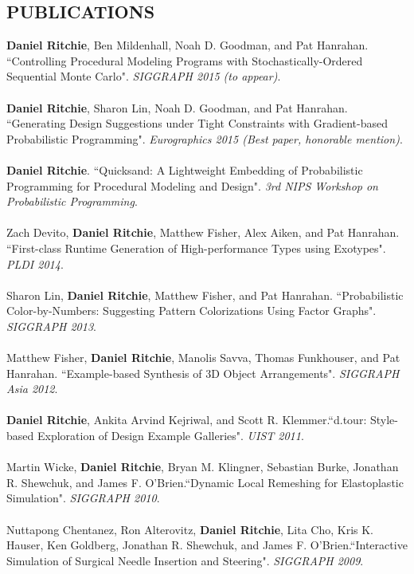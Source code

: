 \documentclass[line,margin]{res}
\begin{document}
\begin{resume}
\section{PUBLICATIONS}
{\bf Daniel Ritchie}, Ben Mildenhall, Noah D. Goodman, and Pat Hanrahan. ``Controlling Procedural Modeling Programs with Stochastically-Ordered Sequential Monte Carlo". {\sl SIGGRAPH 2015 (to appear)}.
\\ \\
{\bf Daniel Ritchie}, Sharon Lin, Noah D. Goodman, and Pat Hanrahan. ``Generating Design Suggestions under Tight Constraints with Gradient-based Probabilistic Programming". {\sl Eurographics 2015 (Best paper, honorable mention)}.
\\ \\
{\bf Daniel Ritchie}. ``Quicksand: A Lightweight Embedding of Probabilistic Programming for Procedural Modeling and Design". {\sl 3rd NIPS Workshop on Probabilistic Programming}.
\\ \\
Zach Devito, {\bf Daniel Ritchie}, Matthew Fisher, Alex Aiken, and Pat Hanrahan. ``First-class Runtime Generation of High-performance Types using Exotypes". {\sl PLDI 2014}.
\\ \\
Sharon Lin, {\bf Daniel Ritchie}, Matthew Fisher, and Pat Hanrahan. ``Probabilistic Color-by-Numbers: Suggesting Pattern Colorizations Using Factor Graphs". {\sl SIGGRAPH 2013}.
\\ \\
Matthew Fisher, {\bf Daniel Ritchie}, Manolis Savva, Thomas Funkhouser, and Pat Hanrahan. ``Example-based Synthesis of 3D Object Arrangements". {\sl SIGGRAPH Asia 2012}.
\\ \\
{\bf Daniel Ritchie}, Ankita Arvind Kejriwal, and Scott R. Klemmer.``d.tour: Style-based Exploration of Design Example Galleries". {\sl UIST 2011}.
\\ \\
Martin Wicke, {\bf Daniel Ritchie}, Bryan M. Klingner, Sebastian Burke, Jonathan R. Shewchuk, and James F. O'Brien.``Dynamic Local Remeshing for Elastoplastic Simulation". {\sl SIGGRAPH 2010}.
\\ \\
Nuttapong Chentanez, Ron Alterovitz, {\bf Daniel Ritchie}, Lita Cho, Kris K. Hauser, Ken Goldberg, Jonathan R. Shewchuk, and James F. O'Brien.``Interactive Simulation of Surgical Needle Insertion and Steering". {\sl SIGGRAPH 2009}. 
 

\end{resume}
\end{document}
